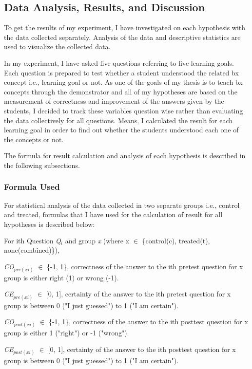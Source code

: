 \subsection{Data Analysis, Results, and Discussion}\label{subsec:results}
To get the results of my experiment, I have investigated on each hypothesis with the data collected separately. Analysis of the data and descriptive statistics are used to visualize the collected data. 

In my experiment, I have asked five questions referring to five learning goals. Each question is prepared to test whether a student understood the related bx concept i.e., learning goal or not. As one of the goals of my thesis is to teach bx concepts through the demonstrator and all of my hypotheses are based on the measurement of correctness and improvement of the answers given by the students, I decided to track these variables question wise rather than evaluating the data collectively for all questions. Means, I calculated the result for each learning goal in order to find out whether the students understood each one of the concepts or not. 

The formula for result calculation and analysis of each hypothesis is described in the following subsections.

\subsubsection{Formula Used}\label{subsubsec:evaluation_formula}
For statistical analysis of the data collected in two separate groups i.e., control and treated, formulas that I have used for the calculation of result for all hypotheses is described below:

For ith Question \textit{Q$_{i}$} and group \textit{x} (where x $\in$ \{control(c), treated(t), none(combined)\}),

\textit{CO$_{pre(xi)}$} $\in$ \{-1, 1\}, correctness of the answer to the ith pretest question for x group is either right (1) or wrong (-1).

\textit{CE$_{pre(xi)}$} $\in$ [0, 1], certainty of the answer to the ith pretest question for x group is between 0 ("I just guessed") to 1 ("I am certain").

\textit{CO$_{post(xi)}$} $\in$ \{-1, 1\}, correctness of the answer to the ith posttest question for x group is either 1 ("right") or -1  ("wrong").

\textit{CE$_{post(xi)}$} $\in$ [0, 1], certainty of the answer to the ith posttest question for x group is between 0 ("I just guessed") to 1 ("I am certain").

